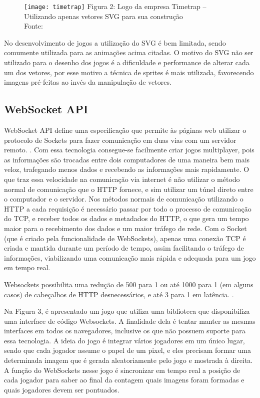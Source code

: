 \begin{figure}[H]
  \centering
	\texttt{[image: timetrap]}
	\footnotesize\hspace{8\baselineskip}
	Figura 2: Logo da empresa Timetrap {--} Utilizando apenas vetores SVG para sua construção \\
	Fonte: \cite{website:svgtimetrap}
  \label{img:timetrap}
\end{figure}

No desenvolvimento de jogos a utilização do SVG é bem limitada, sendo
comumente utilizada para as animações acima citadas. O motivo do SVG
não ser utilizado para o desenho dos jogos é a dificuldade e
performance de alterar cada um dos vetores, por esse motivo
a técnica de sprites é mais utilizada, favorecendo imagens pré-feitas
ao invés da manipulação de vetores.


\subsection{WebSocket API}

WebSocket API define uma especificação que permite às páginas web
utilizar o protocolo de Sockets para fazer comunicação em duas
vias com um servidor remoto. \cite{website:w3cwebsockets}. Com essa tecnologia
consegue-se facilmente criar jogos multiplayer, pois as informações
são trocadas entre dois computadores de uma maneira bem mais
veloz, trafegando menos dados e recebendo as informações mais
rapidamente.
O que traz essa velocidade na comunicação via internet é não utilizar
o método normal de comunicação que o HTTP fornece, e sim utilizar um
túnel direto entre o computador e o servidor.
Nos métodos normais de comunicação utilizando o HTTP a cada requisição
é necessário passar por todo o processo de comunicação do TCP, e
receber todos os dados e metadados do HTTP, o que gera um tempo maior para
o recebimento dos dados e um maior tráfego de rede. Com o Socket (que
é criado pela funcionalidade de WebSockets), apenas uma conexão TCP é
criada e mantida durante um período de tempo, assim facilitando o
tráfego de informações, viabilizando uma comunicação mais rápida e
adequada para um jogo em tempo real.

Websockets possibilita uma redução de 500 para 1 ou até 1000 para 1
(em alguns casos) de cabeçalhos de HTTP desnecessários, e até 3 para 1
em latência. \cite{lubbers2010pro}.

Na Figura 3, é apresentado um jogo que utiliza
uma biblioteca que disponibiliza uma interface de código Websockets.
A finalidade dela é tentar manter as mesmas interfaces em
todos os navegadores, inclusive os que não possuem suporte para essa
tecnologia. A ideia do jogo é integrar vários jogadores em um único lugar, sendo que
cada jogador assume o papel de um pixel, e eles precisam formar uma
determinada imagem que é gerada aleatoriamente pelo jogo e mostrada à
direita. A função do WebSockets nesse jogo é sincronizar em tempo real a
posição de cada jogador para saber ao final da contagem quais imagens
foram formadas e quais jogadores devem ser pontuados.

